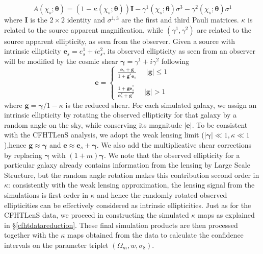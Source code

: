 \documentclass[reprint,aps,prd,superscriptaddress,showkeys,showpacs]{revtex4-1}
\begin{document}
%
\begin{equation}
A(\chi_s;\pmb{\theta}) = (1-\kappa(\chi_s;\pmb{\theta}))\pmb{I} - \gamma^1(\chi_s;\pmb{\theta})\sigma^3 - \gamma^2(\chi_s;\pmb{\theta})\sigma^1
\end{equation}  
%
where $\pmb{I}$ is the $2\times2$ identity and $\sigma^{1,3}$ are the first and third Pauli matrices. $\kappa$ is related to the source apparent magnification, while $(\gamma^1,\gamma^2)$ are related to the source apparent ellipticity, as seen from the observer. Given a source with intrinsic ellipticity $\mathbf{e}_s=e^1_s + ie^2_s$, its observed ellipticity as seen from an observer will be modified by the cosmic shear $\pmb{\gamma}=\gamma^1 + i\gamma^2$ following
%
\begin{equation}
\mathbf{e} = 
\begin{cases}
\frac{\mathbf{e}_s+\mathbf{g}}{1+\mathbf{g}^*\mathbf{e}_s} \,\,\,\,\,\,\,\, \vert \mathbf{g}\vert \leq 1 \\ \\
\frac{1+\mathbf{ge}_s^*}{\mathbf{e}_s^* + \mathbf{g}^*} \,\,\,\,\,\,\,\, \vert \mathbf{g}\vert > 1
\end{cases}
\end{equation}
%
where $\mathbf{g} = \pmb{\gamma}/1-\kappa$ is the reduced shear. For each simulated galaxy, we assign an intrinsic ellipticity by rotating the observed ellipticity for that galaxy by a random angle on the sky, while conserving its magnitude $\vert\mathbf{e}\vert$. To be consistent with the CFHTLenS analysis, we adopt the weak lensing limit ($\vert\pmb{\gamma}\vert\ll1,\kappa\ll1$),hence $\mathbf{g}\approx\pmb{\gamma}$ and $\mathbf{e}\approx \mathbf{e}_s+\pmb{\gamma}$. We also add the multiplicative shear corrections by replacing $\pmb{\gamma}$ with $(1+m)\pmb{\gamma}$. We note that the observed ellipticity for a particular galaxy already contains information from the lensing by Large Scale Structure, but the random angle rotation makes this contribution second order in $\kappa$: consistently with the weak lensing approximation, the lensing signal from the simulations is first order in $\kappa$ and hence the randomly rotated observed ellipticities can be effectively considered as intrinsic ellipticities. Just as for the CFHTLenS data, we proceed in constructing the simulated $\kappa$ maps as explained in \S\ref{cfhtdatareduction}. These final simulation products are then processed together with the $\kappa$ maps obtained from the data to calculate the confidence intervals on the parameter triplet $(\Omega_m,w,\sigma_8)$.
\end{document}
